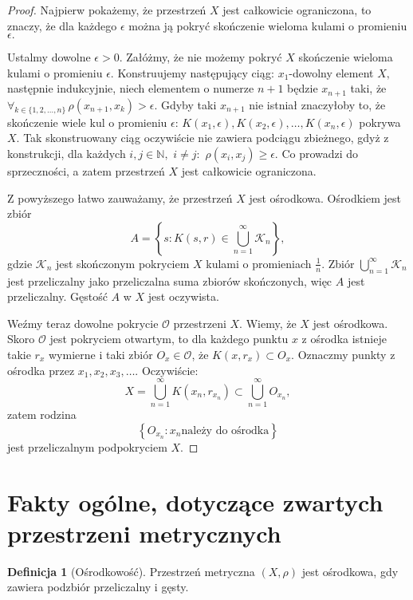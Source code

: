 \documentclass[licencjacka]{pwr_wmat_praca_dyplomowa}
\theoremstyle{plain}
\numberwithin{theorem}{chapter}
\theoremstyle{definition}
\numberwithin{theorem}{chapter}
\newtheorem{definition}[theorem]{Definicja}
\begin{document}
\begin{proof}
Najpierw pokażemy, że przestrzeń $X$ jest całkowicie ograniczona, to znaczy, że  dla każdego $\epsilon$ można ją pokryć skończenie wieloma kulami o promieniu $\epsilon.$

Ustalmy dowolne $\epsilon > 0.$ Załóżmy, że nie możemy pokryć $X$ skończenie wieloma kulami o promieniu $\epsilon.$ 
Konstruujemy następujący ciąg: $x_1$-dowolny element $X,$ następnie indukcyjnie, niech elementem o numerze $n+1$ będzie $x_{n+1}$ taki, że $\forall_{k \in \{1,2, \ldots, n\}} \, \rho(x_{n+1}, x_k) > \epsilon.$ Gdyby taki $x_{n+1}$ nie istniał znaczyłoby to, że skończenie wiele kul o promieniu $\epsilon$: $K(x_1, \epsilon), K(x_2, \epsilon), \ldots, K(x_n, \epsilon)$ pokrywa $X.$ Tak skonstruowany ciąg oczywiście nie zawiera podciągu zbieżnego, gdyż z konstrukcji, dla każdych $i,j \in \mathbb{N}, $ $i \neq j: $ $\rho(x_i, x_j) \geq \epsilon.$ Co prowadzi do sprzeczności, a zatem przestrzeń $X$ jest całkowicie ograniczona.

Z powyższego łatwo zauważamy, że przestrzeń $X$ jest ośrodkowa. Ośrodkiem jest zbiór 
$$A = \left\{ s : K(s, r) \in \bigcup_{n=1}^{\infty}\mathcal{K}_n \right\},$$
gdzie $\mathcal{K}_n$ jest skończonym pokryciem $X$ kulami o promieniach $\frac{1}{n}.$ Zbiór $\bigcup_{n=1}^{\infty}\mathcal{K}_n$ jest przeliczalny jako przeliczalna suma zbiorów skończonych, więc $A$ jest przeliczalny. Gęstość $A$ w $X$ jest oczywista.

Weźmy teraz dowolne pokrycie $\mathcal{O}$ przestrzeni $X.$ Wiemy, że $X$ jest ośrodkowa. Skoro $\mathcal{O}$ jest pokryciem otwartym, to dla każdego punktu $x$ z ośrodka istnieje takie $r_x$ wymierne i taki zbiór $O_x \in \mathcal{O}$, że $K(x,r_x) \subset O_x.$ Oznaczmy punkty z ośrodka przez $x_1, x_2, x_3, \ldots.$ Oczywiście:
$$X = \bigcup_{n=1}^{\infty}K(x_n, r_{x_n}) \subset \bigcup_{n=1}^{\infty}O_{x_n},$$
zatem rodzina 
$$\left\{O_{x_n} : x_n \textrm{należy do ośrodka} \right\}$$
jest przeliczalnym podpokryciem $X.$

\end{proof}


\section{Fakty ogólne, dotyczące zwartych przestrzeni metrycznych}


\begin{definition}[Ośrodkowość]
Przestrzeń metryczna $(X, \rho)$ jest ośrodkowa, gdy zawiera podzbiór przeliczalny i gęsty.
\end{definition}
\end{document}
